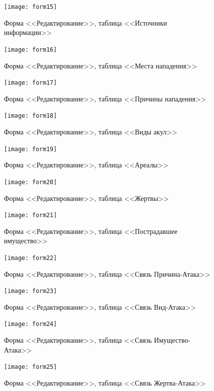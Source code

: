 \documentclass[russian,utf8,simple,emptystyle]{eskdtext}
\begin{document}
\begin{figure}[hb]
\centering
\texttt{[image: form15]}
\caption{Форма <<Редактирование>>, таблица <<Источники информации>>}
\end{figure}

\begin{figure}[ht]
\centering
\texttt{[image: form16]}
\caption{Форма <<Редактирование>>, таблица <<Места нападения>>}
\end{figure}

\begin{figure}[hb]
\centering
\texttt{[image: form17]}
\caption{Форма <<Редактирование>>, таблица <<Причины нападения>>}
\end{figure}

\begin{figure}[ht]
\centering
\texttt{[image: form18]}
\caption{Форма <<Редактирование>>, таблица <<Виды акул>>}
\end{figure}

\begin{figure}[hb]
\centering
\texttt{[image: form19]}
\caption{Форма <<Редактирование>>, таблица <<Ареалы>>}
\end{figure}

\begin{figure}[ht]
\centering
\texttt{[image: form20]}
\caption{Форма <<Редактирование>>, таблица <<Жертвы>>}
\end{figure}

\begin{figure}[hb]
\centering
\texttt{[image: form21]}
\caption{Форма <<Редактирование>>, таблица <<Пострадавшее имущество>>}
\end{figure}

\begin{figure}[ht]
\centering
\texttt{[image: form22]}
\caption{Форма <<Редактирование>>, таблица <<Связь Причина-Атака>>}
\end{figure}

\begin{figure}[hb]
\centering
\texttt{[image: form23]}
\caption{Форма <<Редактирование>>, таблица <<Связь Вид-Атака>>}
\end{figure}

\begin{figure}[ht]
\centering
\texttt{[image: form24]}
\caption{Форма <<Редактирование>>, таблица <<Связь Имущество-Атака>>}
\end{figure}

\begin{figure}[hb]
\centering
\texttt{[image: form25]}
\caption{Форма <<Редактирование>>, таблица <<Связь Жертва-Атака>>}
\end{figure}
\end{document}
